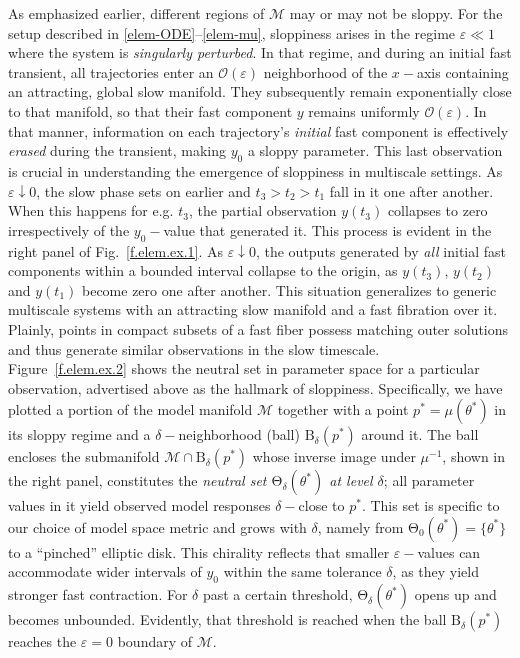 \documentclass{article}
\newcommand{\eps}{\varepsilon}
\newcommand{\p}{\theta}
\newcommand{\omr}{\mu}
\newcommand{\omm}{\mathcal{M}}
\newcommand{\ps}{\mathrm{\Theta}}
\newcommand{\Ord}{\mathcal{O}}
\begin{document}
As emphasized earlier, different regions of $\omm$ may or may not be sloppy.
For the setup described in \eqref{elem-ODE}--\eqref{elem-mu}, sloppiness arises in the regime $\eps \ll 1$ where the system is \emph{singularly perturbed}.
In that regime, and during an initial fast transient, all trajectories enter an $\Ord(\eps)$ neighborhood of the $x-$axis containing an attracting, global slow manifold.
They subsequently remain exponentially close to that manifold, so that their fast component $y$ remains uniformly $\Ord(\eps)$.
In that manner, information on each trajectory's \emph{initial} fast component is effectively \emph{erased} during the transient, making $y_0$ a sloppy parameter.
This last observation is crucial in understanding the emergence of sloppiness in multiscale settings.
As $\eps \downarrow 0$, the slow phase sets on earlier and $t_3 > t_2 > t_1$ fall in it one after another.
When this happens for e.g. $t_3$, the partial observation $y(t_3)$ collapses to zero irrespectively of the $y_0-$value that generated it.
This process is evident in the right panel of Fig.~\ref{f.elem.ex.1}.
As $\eps\downarrow0$, the outputs generated by \emph{all} initial fast components within a bounded interval collapse to the origin, as  $y(t_3)$, $y(t_2)$ and $y(t_1)$ become zero one after another.
This situation generalizes to generic multiscale systems with an attracting slow manifold and a fast fibration over it.
Plainly, points in compact subsets of a fast fiber possess matching outer solutions and thus generate similar observations in the slow timescale.\\

Figure~\ref{f.elem.ex.2} shows the neutral set in parameter space for a particular observation, advertised above as the hallmark of sloppiness.
Specifically, we have plotted a portion of the model manifold $\omm$ together with a point $p^* = \omr(\p^*)$ in its sloppy regime and a $\delta-$neighborhood (ball) $\mathrm{B}_\delta(p^*)$ around it.
The ball encloses the submanifold $\omm \cap \mathrm{B}_\delta(p^*)$ whose inverse image under $\omr^{-1}$, shown in the right panel, constitutes the \emph{neutral set $\ps_\delta(\p^*)$ at level $\delta$}; all parameter values in it yield observed model responses $\delta-$close to $p^*$.
This set is specific to our choice of model space metric and grows with $\delta$, namely from $\ps_0(\p^*) = \{\p^*\}$ to a ``pinched'' elliptic disk.
This chirality reflects that smaller $\eps-$values can accommodate wider intervals of $y_0$ within the same tolerance $\delta$, as they yield stronger fast contraction.
For $\delta$ past a certain threshold, $\ps_\delta(\p^*)$ opens up and becomes unbounded.
Evidently, that threshold is reached when the ball $\mathrm{B}_\delta(p^*)$ reaches the $\eps=0$ boundary of $\omm$.\\
\end{document}

